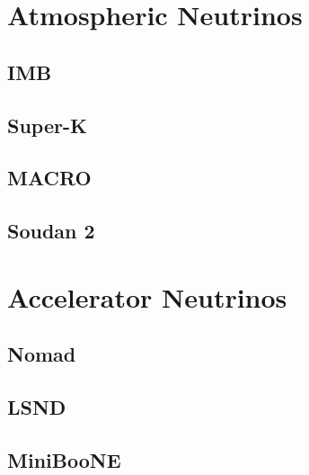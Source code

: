 \section{Atmospheric Neutrinos}

\subsection{IMB}

\subsection{Super-K}

\subsection{MACRO}

\subsection{Soudan 2}

\section{Accelerator Neutrinos}

\subsection{Nomad}

\subsection{LSND}

\subsection{MiniBooNE}
